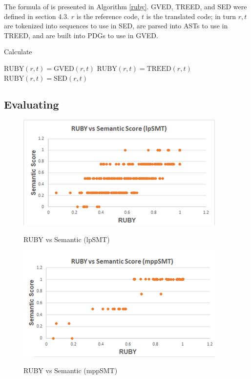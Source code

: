 The formula of {\model} is presented in Algorithm \ref{ruby}. GVED, TREED, and SED were defined in section 4.3. $r$ is the reference code, $t$ is the translated code; in turn $r,t$ are tokenized into sequences to use in SED, are parsed into ASTs to use in TREED, and are built into PDGs to use in GVED.  
\makeatletter
\def\BState{\State\hskip-\ALG@thistlm}
\makeatother
\begin{algorithm}
\caption{Calculate {\model}}\label{ruby}
\begin{algorithmic}[1]
\State $\mbox{RUBY}\left(r,t\right) = \mbox{GVED}\left(r,t\right) $
\State $\mbox{RUBY}\left(r,t\right) = \mbox{TREED}\left(r,t\right) $
\Else 
\State $\mbox{RUBY}\left(r,t\right) = \mbox{SED}\left(r,t\right) $
\EndIf
\end{algorithmic}
\end{algorithm}

\subsection{Evaluating {\model} }

\begin{figure}
\caption{RUBY vs Semantic (lpSMT)}
\centering
\includegraphics{img/rubyvssem_lpSMT.png}
\label{fig:RubySemlpSMT}
\end{figure}

\begin{figure}
\caption{RUBY vs Semantic (mppSMT)}
\centering
\includegraphics{img/rubyvssem_mppSMT.png}
\label{fig:RubySemMppSMT}
\end{figure}

